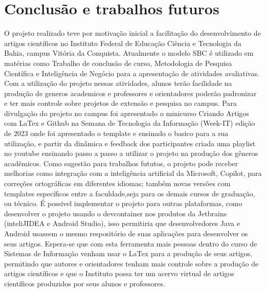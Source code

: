 \section{Conclusão e trabalhos futuros}

O projeto realizado teve por motivação inicial a facilitação do desenvolvimento de artigos científicos no Instituto Federal de Educação Ciência e Tecnologia da Bahia, campus Vitória da Conquista. Atualmente o modelo SBC é utilizado em matérias como Trabalho de conclusão de curso, Metodologia de Pesquisa Científica e Inteligência de Negócio para a apresentação de atividades avaliativas. Com a utilização do projeto nessas atividades, alunos terão facilidade na produção de generos academicos e professores e orientadores poderão padronizar e ter mais controle sobre projetos de extensão e pesquisa no campus.
Para divulgação do projeto no campus foi apresentado o minicurso Criando Artigos com LaTex e Github na Semana de Tecnologia da Informação (Week-IT) edição de 2023 onde foi apresentado o template e ensinado o basico para a sua utilização, e partir da dinâmica e feedback dos participantes criada uma playlist no youtube ensinando passo a passo a utilizar o projeto na produção dos gêneros acadêmicos.
Como sugestão para trabalhos fututos, o projeto pode receber melhorias como integração com a inteligência artificial da Microsoft, Copilot, para correções ortográficas em diferentes idiomas; também novas versões com templates específicos entre a faculdade,seja para os demais cursos de graduação, ou técnico. É possivel implementar o projeto para outras plataformas, como desenvolver o projeto usando o devcontainer nos produtos da Jetbrains (inteliJIDEA e Android Studio), isso permitiria que desenvolvedores Java e Android usassem o mesmo respositório de suas aplicações para desenvolver os seus artigos.
Espera-se que com esta ferramenta mais pessoas dentro do curso de Sistemas de Informação venham usar o LaTex para a produção de seus artigos, permitindo que autores e orientadores tenham mais controle sobre a produção de artigos científicos e que o Instituto possa ter um acervo virtual de artigos científicos produzidos por seus alunos e professores.